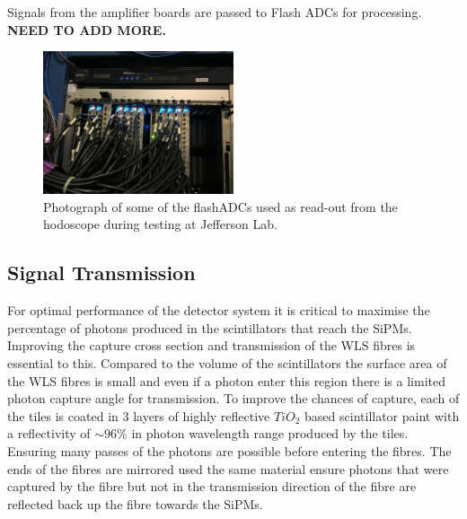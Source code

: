 Signals from the amplifier boards are passed to Flash ADCs for processing. \textbf{NEED TO ADD MORE.}

\begin{figure}
	\centering
	\includegraphics[width=0.5\textwidth]{ImgChap1/FlashADC}
	\caption{Photograph of some of the flashADCs used as read-out from the hodoscope during testing at Jefferson Lab.}
	\label{FlashADC}
\end{figure}

%
%
%



\subsection{Signal Transmission}

For optimal performance of the detector system it is critical to maximise the percentage of photons produced in the scintillators that reach the SiPMs. Improving the capture cross section and transmission of the WLS fibres is essential to this.  Compared to the volume of the scintillators the surface area of the WLS fibres is small and even if a photon enter this region there is a limited photon capture angle for transmission. To improve the chances of capture, each of the tiles is coated in 3 layers of highly reflective $TiO_{2}$ based scintillator paint with a reflectivity of $\sim 96\%$ in photon wavelength range produced by the tiles. Ensuring many passes of the photons are possible before entering the fibres. The ends of the fibres are mirrored used the same material ensure photons that were captured by the fibre but not in the transmission direction of the fibre are reflected back up the fibre towards the SiPMs. 

